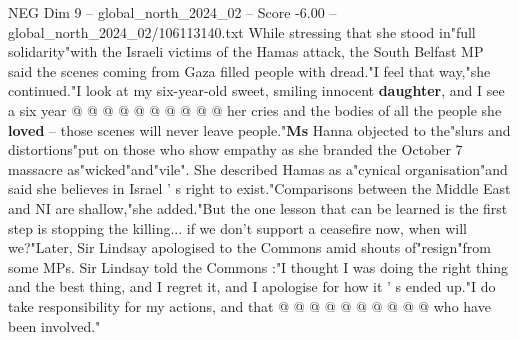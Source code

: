 \begin{textsample}{NEG Dim 9 – global\_north\_2024\_02 – Score -6.00 – global\_north\_2024\_02/106113140.txt}
While stressing that she stood in"full solidarity"with the Israeli victims of the Hamas attack, the South Belfast MP said the scenes coming from Gaza filled people with dread."I feel that way,"she continued."I look at my six-year-old sweet, smiling innocent \textbf{daughter}, and I see a six year @ @ @ @ @ @ @ @ @ @ her cries and the bodies of all the people she \textbf{loved} -- those scenes will never leave people."\textbf{Ms} Hanna objected to the"slurs and distortions"put on those who show empathy as she branded the October 7 massacre as"wicked"and"vile".
She described Hamas as a"cynical organisation"and said she believes in Israel ' s right to exist."Comparisons between the Middle East and NI are shallow,"she added."But the one lesson that can be learned is the first step is stopping the killing... if we don't support a ceasefire now, when will we?"Later, Sir Lindsay apologised to the Commons amid shouts of"resign"from some MPs.
Sir Lindsay told the Commons :"I thought I was doing the right thing and the best thing, and I regret it, and I apologise for how it ' s ended up."I do take responsibility for my actions, and that @ @ @ @ @ @ @ @ @ @ who have been involved."

\end{textsample}
